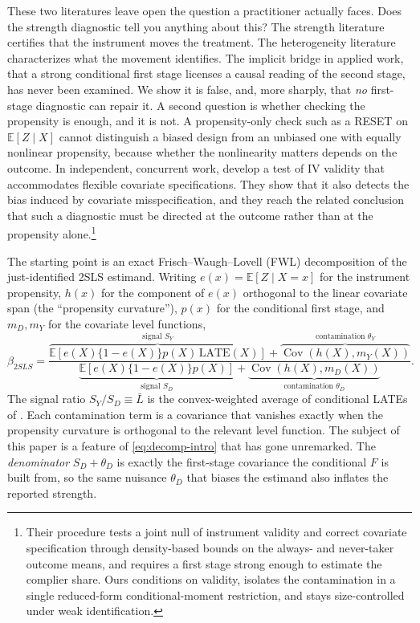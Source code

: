 \documentclass[11pt]{article}
\theoremstyle{plain}
\theoremstyle{definition}
\newcommand{\E}{\mathbb{E}}
\newcommand{\Cov}{\operatorname{Cov}}
\newcommand{\Lb}{\bar{L}}
\begin{document}
These two literatures leave open the question a practitioner actually faces. Does the strength diagnostic tell you anything about this? The strength literature certifies that the instrument moves the treatment. The heterogeneity literature characterizes what the movement identifies. The implicit bridge in applied work, that a strong conditional first stage licenses a causal reading of the second stage, has never been examined. We show it is false, and, more sharply, that \emph{no} first-stage diagnostic can repair it. A second question is whether checking the propensity is enough, and it is not. A propensity-only check such as a RESET on $\E[Z\mid X]$ cannot distinguish a biased design from an unbiased one with equally nonlinear propensity, because whether the nonlinearity matters depends on the outcome. In independent, concurrent work, \citet{krummewestphal2026} develop a test of IV validity that accommodates flexible covariate specifications. They show that it also detects the bias induced by covariate misspecification, and they reach the related conclusion that such a diagnostic must be directed at the outcome rather than at the propensity alone.\footnote{Their procedure tests a joint null of instrument validity and correct covariate specification through density-based bounds on the always- and never-taker outcome means, and requires a first stage strong enough to estimate the complier share. Ours conditions on validity, isolates the contamination in a single reduced-form conditional-moment restriction, and stays size-controlled under weak identification.}

The starting point is an exact Frisch--Waugh--Lovell (FWL) decomposition of the just-identified 2SLS estimand. Writing $e(x)=\E[Z\mid X=x]$ for the instrument propensity, $h(x)$ for the component of $e(x)$ orthogonal to the linear covariate span (the ``propensity curvature''), $p(x)$ for the conditional first stage, and $m_D,m_Y$ for the covariate level functions,
\begin{equation}\label{eq:decomp-intro}
\beta_{2SLS}=\frac{\overbrace{\E[e(X)\{1-e(X)\}p(X)\,\mathrm{LATE}(X)]}^{\text{signal }S_Y}+\overbrace{\Cov(h(X),m_Y(X))}^{\text{contamination }\theta_Y}}{\underbrace{\E[e(X)\{1-e(X)\}p(X)]}_{\text{signal }S_D}+\underbrace{\Cov(h(X),m_D(X))}_{\text{contamination }\theta_D}}.
\end{equation}
The signal ratio $S_Y/S_D\equiv\Lb$ is the convex-weighted average of conditional LATEs of \citet{blandhol2022}. Each contamination term is a covariance that vanishes exactly when the propensity curvature is orthogonal to the relevant level function. The subject of this paper is a feature of \eqref{eq:decomp-intro} that has gone unremarked. The \emph{denominator} $S_D+\theta_D$ is exactly the first-stage covariance the conditional $F$ is built from, so the same nuisance $\theta_D$ that biases the estimand also inflates the reported strength.
\end{document}
